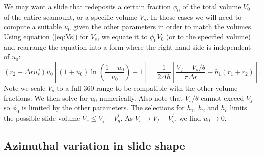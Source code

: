 We may want a slide that redeposits a certain fraction $\phi_0$ of the total volume $V_0$ of the entire seamount, or
a specific volume $V_s$. In those cases we will need to compute a suitable $u_0$ given the other parameters in order to match the volumes.
Using equation (\ref{eq:Vs}) for $V_s$, we equate it to $\phi_0 V_0$ (or to the specified volume) and rearrange the equation
into a form where the right-hand side is independent of $u_0$:
\begin{equation}
\left ( r_2 + \Delta r \bar{u}_s^q \right ) u_0 \left [ (1 + u_0) \ln \left (\frac{1 + u_0}{u_0} \right ) - 1 \right ] = \frac{1}{2\Delta h} \left [\frac{V_f - V_s/\theta}{\pi \Delta r} - h_1(r_1 + r_2) \right ].
\label{eq:u0}
\end{equation}
Note we scale $V_s$ to a full 360-range to be compatible with the other volume fractions.  We then solve for
$u_0$ numerically. Also note that $V_s/\theta$ cannot exceed $V_f$ so $\phi_0$ is limited by the other parameters.
The selections for $h_1$, $h_2$ and $h_c$ limits the possible slide volume $V_s \le V_f-V^l_q$. As
$V_s \rightarrow V_f-V^l_q$, we find $u_0 \rightarrow 0$.

\subsection{Azimuthal variation in slide shape}

